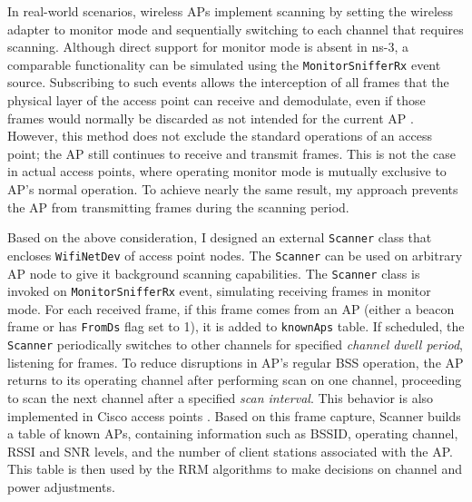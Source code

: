 In real-world scenarios, wireless APs implement scanning by setting the wireless adapter to monitor mode and sequentially switching to each channel that requires scanning. Although direct support for monitor mode is absent in ns-3, a comparable functionality can be simulated using the \texttt{MonitorSnifferRx} event source. Subscribing to such events allows the interception of all frames that the physical layer of the access point can receive and demodulate, even if those frames would normally be discarded as not intended for the current AP \cite{Ns3AllTraceSources}. However, this method does not exclude the standard operations of an access point; the AP still continues to receive and transmit frames. This is not the case in actual access points, where operating monitor mode is mutually exclusive to AP's normal operation. To achieve nearly the same result, my approach prevents the AP from transmitting frames during the scanning period.

Based on the above consideration, I designed an external \texttt{Scanner} class that encloses \texttt{WifiNetDev} of access point nodes. The \texttt{Scanner} can be used on arbitrary AP node to give it background scanning capabilities.
The \texttt{Scanner} class is invoked on \texttt{MonitorSnifferRx} event, simulating receiving frames in monitor mode. For each received frame, if this frame comes from an AP (either a beacon frame or has \texttt{FromDs} flag set to 1), it is added to \texttt{knownAps} table.
If scheduled, the \texttt{Scanner} periodically switches to other channels for specified \textit{channel dwell period}, listening for frames. To reduce disruptions in AP's regular BSS operation, the AP returns to its operating channel after performing scan on one channel, proceeding to scan the next channel after a specified \textit{scan interval}. This behavior is also implemented in Cisco access points \cite{ciscoRadioResourceManagement}.
Based on this frame capture, Scanner builds a table of known APs, containing information such as BSSID, operating channel, RSSI and SNR levels, and the number of client stations associated with the AP. This table is then used by the RRM algorithms to make decisions on channel and power adjustments.

